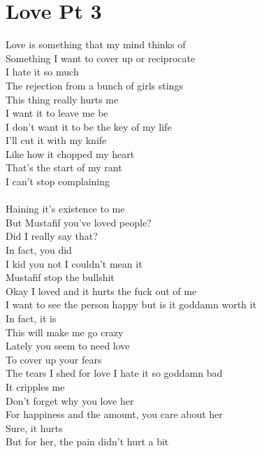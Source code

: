 \documentclass[12pt, b5paper]{article}
\begin{document}
\section{Love Pt 3}
Love is something that my mind thinks of 
\\Something I want to cover up or reciprocate
\\I hate it so much
\\The rejection from a bunch of girls stings 
\\This thing really hurts me 
\\I want it to leave me be 
\\I don’t want it to be the key of my life 
\\I’ll cut it with my knife 
\\Like how it chopped my heart 
\\That’s the start of my rant 
\\I can’t stop complaining 
\\\\Haining it's existence to me 
\\But Mustafif you've loved people?
\\Did I really say that?
\\In fact, you did 
\\I kid you not I couldn’t mean it 
\\Mustafif stop the bullshit 
\\Okay I loved and it hurts the fuck out of me
\\I want to see the person happy but is it goddamn worth it
\\In fact, it is 
\\This will make me go crazy
\\Lately you seem to need love 
\\To cover up your fears 
\\The tears I shed for love I hate it so goddamn bad
\\It cripples me 
\\Don’t forget why you love her
\\For happiness and the amount, you care about her 
\\Sure, it hurts 
\\But for her, the pain didn’t hurt a bit

\newpage 
\end{document}
